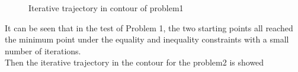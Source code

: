 \begin{figure}[H]
\centering
{}
\quad
{}
\caption{ Iterative trajectory in contour of problem1}
\end{figure}
It can be seen that in the test of Problem 1, the two starting  points all reached the minimum point under the equality and inequality constraints with a small number of iterations.\\
Then the iterative trajectory in the contour for the problem2 is showed 
